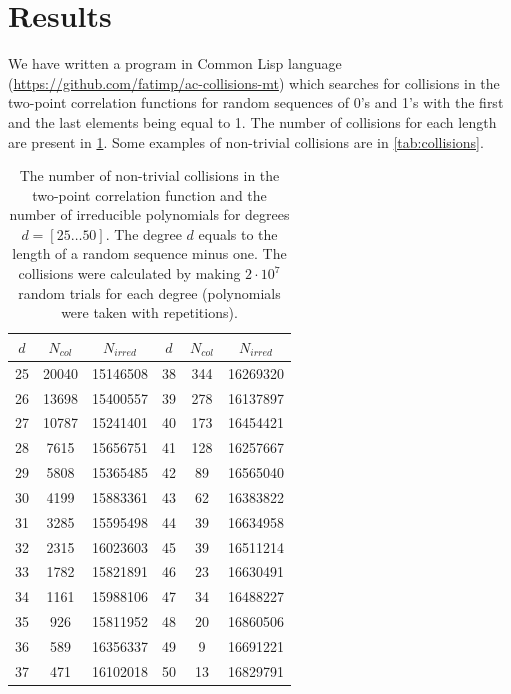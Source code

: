 \documentclass[12pt, a4paper]{article}
\begin{document}
\section{Results}
We have written a program in Common Lisp language
(\url{https://github.com/fatimp/ac-collisions-mt}) which searches for collisions
in the two-point correlation functions for random sequences of 0's and 1's with
the first and the last elements being equal to 1. The number of collisions for
each length are present in \cref{tab:numbers}. Some examples of non-trivial
collisions are in \cref{tab:collisions}.
\begin{table}[!pt]
  \centering
  \begin{tabular}{|c|c|c||c|c|c|}
    \hline
    $d$ & $N_{col}$ & $N_{irred}$ & $d$ & $N_{col}$ & $N_{irred}$\\
    \hline
    \hline
    25 & 20040 & 15146508 & 38 & 344 & 16269320 \\
    \hline
    26 & 13698 & 15400557 & 39 & 278 & 16137897 \\
    \hline
    27 & 10787 & 15241401 & 40 & 173 & 16454421 \\
    \hline
    28 & 7615 & 15656751 & 41 & 128 & 16257667 \\
    \hline
    29 & 5808 & 15365485 & 42 & 89 & 16565040 \\
    \hline
    30 & 4199 & 15883361 & 43 & 62 & 16383822 \\
    \hline
    31 & 3285 & 15595498 & 44 & 39 & 16634958 \\
    \hline
    32 & 2315 & 16023603 & 45 & 39 & 16511214 \\
    \hline
    33 & 1782 & 15821891 & 46 & 23 & 16630491 \\
    \hline
    34 & 1161 & 15988106 & 47 & 34 & 16488227 \\ 
    \hline
    35 & 926 & 15811952 & 48 & 20 & 16860506 \\
    \hline
    36 & 589 & 16356337 & 49 & 9 & 16691221 \\
    \hline
    37 & 471 & 16102018 & 50 & 13 & 16829791 \\
    \hline
  \end{tabular}
  \caption{The number of non-trivial collisions in the two-point correlation
    function and the number of irreducible polynomials for degrees
    $d = [25 \dots 50]$. The degree $d$ equals to the length of a random
    sequence minus one. The collisions were calculated by making $2 \cdot 10^7$
    random trials for each degree (polynomials were taken with repetitions).}
  \label{tab:numbers}
\end{table}
\end{document}
